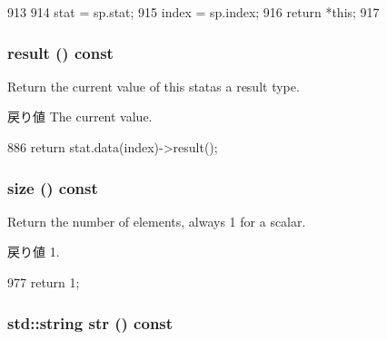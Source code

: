 \begin{DoxyCode}
913     {
914         stat = sp.stat;
915         index = sp.index;
916         return *this;
917     }
\end{DoxyCode}
\hypertarget{classStats_1_1ScalarProxy_ae050da86c3d8e8a677a0bdeb7971e1e3}{
\subsubsection[{result}]{ result () const}}
\label{classStats_1_1ScalarProxy_ae050da86c3d8e8a677a0bdeb7971e1e3}
Return the current value of this statas a result type. \begin{DoxyReturn}{戻り値}
The current value. 
\end{DoxyReturn}



\begin{DoxyCode}
886 { return stat.data(index)->result(); }
\end{DoxyCode}
\hypertarget{classStats_1_1ScalarProxy_a503ab01f6c0142145d3434f6924714e7}{
\subsubsection[{size}]{ size () const}}
\label{classStats_1_1ScalarProxy_a503ab01f6c0142145d3434f6924714e7}
Return the number of elements, always 1 for a scalar. \begin{DoxyReturn}{戻り値}
1. 
\end{DoxyReturn}



\begin{DoxyCode}
977 { return 1; }
\end{DoxyCode}
\hypertarget{classStats_1_1ScalarProxy_a1b9b8885b0880fc4ddf9a2c7d1ca3dc4}{
\subsubsection[{str}]{\setlength{\rightskip}{0pt plus 5cm}std::string str () const}}
\label{classStats_1_1ScalarProxy_a1b9b8885b0880fc4ddf9a2c7d1ca3dc4}




